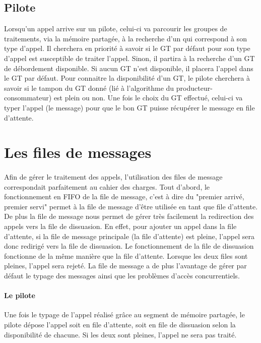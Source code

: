\documentclass{report}
\begin{document}
		\subsection{Pilote}
			Lorsqu'un appel arrive sur un pilote, celui-ci va parcourir les groupes de traitements, via la mémoire partagée, à la recherche d'un qui correspond à son type d'appel. Il cherchera en priorité à savoir si le GT par défaut pour son type d'appel est susceptible de traiter l'appel. Sinon, il partira à la recherche d'un GT de débordement disponible. Si aucun GT n'est disponible, il placera l'appel dans le GT par défaut. Pour connaitre la disponibilité d'un GT, le pilote cherchera à savoir si le tampon du GT donné (lié à l'algorithme du producteur-consommateur) est plein ou non. Une fois le choix du GT effectué, celui-ci va typer l'appel (le message) pour que le bon GT puisse récupérer le message en file d'attente.

	\section{Les files de messages}
		\paragraph{}
			Afin de gérer le traitement des appels, l'utilisation des files de message correspondait parfaitement au cahier des charges. Tout d'abord, le fonctionnement en FIFO de la file de message, c'est à dire du "premier arrivé, premier servi" permet à la file de message d'être utilisée en tant que file d'attente. De plus la file de message nous permet de gérer très facilement la redirection des appels vers la file de dissuasion. En effet, pour ajouter un appel dans la file d'attente, si la file de message principale (la file d'attente) est pleine, l'appel sera donc redirigé vers la file de dissuasion. Le fonctionnement de la file de dissuasion fonctionne de la même manière que la file d'attente. Lorsque les deux files sont pleines, l'appel sera rejeté. La file de message a de plus l'avantage de gérer par défaut le typage des messages ainsi que les problèmes d'accès concurrentiels.
		\paragraph{Le pilote}
			Une fois le typage de l'appel réalisé grâce au segment de mémoire partagée, le pilote dépose l'appel soit en file d'attente, soit en file de dissuasion selon la disponibilité de chacune. Si les deux sont pleines, l'appel ne sera pas traité.
\end{document}
